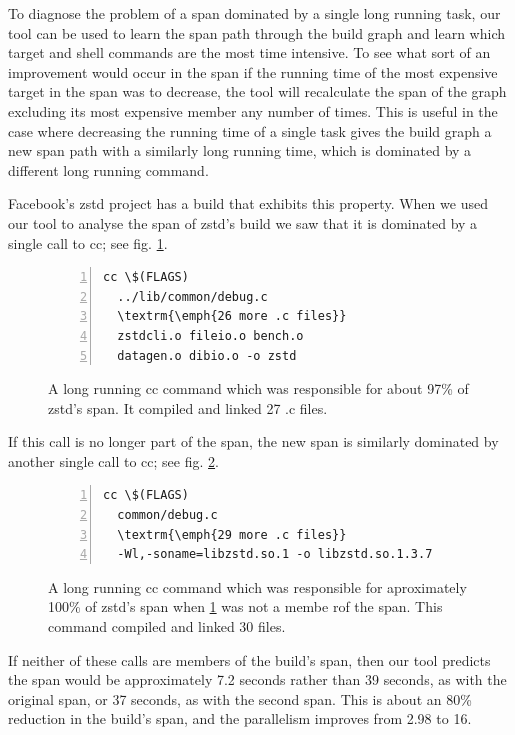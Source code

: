 \documentclass[sigconf,10pt,authorversion]{acmart}\settopmatter{printfolios=true,printccs=false,printacmref=false}
\begin{document}
To diagnose the problem of a span dominated by a single long running task, our tool can be used
to learn the span path through the build graph and learn which target and shell commands
are the most time intensive.  To see what sort of an improvement would occur in the span if the
running time of the most expensive target in the span was to decrease, the tool will recalculate
the span of the graph excluding its most expensive member any number of times.  This is useful
in the case where decreasing the running time of a single task gives the build graph a new span
path with a similarly long running time, which is dominated by a different long running command.

Facebook's zstd project \cite{zstd1.3.7} has a build that exhibits this property.  When we used our tool to analyse
the span of zstd's build we saw that it is dominated by a single call to cc; see fig. \ref{code:cc1}.

\begin{figure}[H]
\begin{Verbatim}[commandchars=\\\{\},codes={\catcode`$=3\catcode`^=7\catcode`_=8},fontsize=\small,numbers=left,xleftmargin=5mm]
  cc \$(FLAGS)
  ../lib/common/debug.c
  \textrm{\emph{26 more .c files}}
  zstdcli.o fileio.o bench.o
  datagen.o dibio.o -o zstd
\end{Verbatim}
\caption{A long running cc command which was responsible for about 97\% of zstd's span.  It compiled and linked 27 .c files.}
\label{code:cc1}
\end{figure}

If this call is no longer part of the span, the new span is similarly dominated by another single call to cc;
see fig. \ref{code:cc2}.
\begin{figure}[H]
\begin{Verbatim}[commandchars=\\\{\},codes={\catcode`$=3\catcode`^=7\catcode`_=8},fontsize=\small,numbers=left,xleftmargin=5mm]
  cc \$(FLAGS)
  common/debug.c
  \textrm{\emph{29 more .c files}}
  -Wl,-soname=libzstd.so.1 -o libzstd.so.1.3.7
\end{Verbatim}
\caption{A long running cc command which was responsible for aproximately 100\% of zstd's span when \ref{code:cc1} was not a membe rof the span.
This command compiled and linked 30 files.}
\label{code:cc2}
\end{figure}
If neither of these calls are members of the build's span, then our tool predicts the span would be
approximately 7.2 seconds rather than 39 seconds, as with the original span, or 37 seconds, as with the second span.
This is about an 80\% reduction in the build's span, and the parallelism improves from 2.98 to 16.
\end{document}
